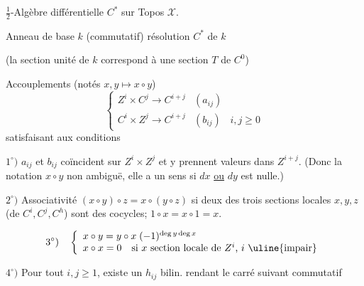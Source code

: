 $\frac12$-Algèbre différentielle $C^*$ sur Topos $\mathcal X$.

Anneau de base $k$ (commutatif)
résolution $C^*$ de $k$



(la section unité de $k$ correspond à une section $T$ de $C^0$)


Accouplements (notés $x,y\longmapsto x\circ y$)
\[
\left\{\begin{array}{lll}
Z^i\times C^j\longrightarrow C^{i+j}&(a_{ij})\\
C^i\times Z^j\longrightarrow C^{i+j}&(b_{ij})&i,j\geq0
\end{array}\right.
\]
satisfaisant aux conditions

$1^\circ)$ $a_{ij}$ et $b_{ij}$ coïncident sur $Z^i\times Z^j$ et
y prennent valeurs dans $Z^{i+j}$. (Donc la notation
$x\circ y$ non ambiguë, elle a un sens si $dx$ \uline{ou} $dy$ est nulle.)

$2^\circ)$ Associativité $(x\circ y)\circ z=x\circ(y\circ z)$ si deux
des trois sections locales $x,y,z$ (de $C^i,C^j,C^h$)
sont des cocycles; $1\circ x=x\circ1=x$.

\[
3^\circ)\quad\left\{\begin{array}{l}
x\circ y=y\circ x\;(-1)^{\deg y\deg x}\\
x\circ x=0\quad\text{si $x$ section locale de $Z^i$, $i$ \uline{impair}}
\end{array}\right.
\]


$4^\circ)$ Pour tout $i,j\geq1$, existe un $h_{ij}$ bilin.
rendant le carré suivant commutatif

